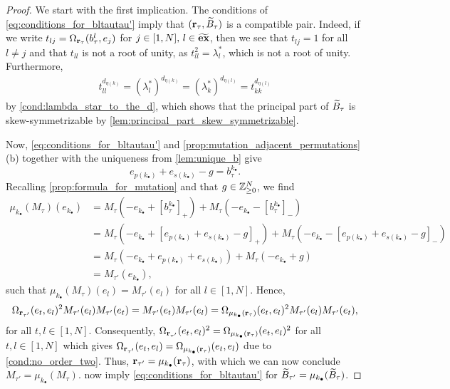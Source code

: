 \begin{proof}

	We start with the first implication. The conditions of
	\cref{eq:conditions_for_bltautau'} imply that $(\mathbf{r}_\tau, \widetilde{B}_{\tau})$ is a compatible
	pair. Indeed, if we write $t_{lj} = \Omega_{\mathbf{r}_\tau}(b^l_{\tau}, e_j)$ for $j\in[1,
			N],\, l \in \widetilde{\mathbf{ex}}$, then we see that $t_{lj} = 1$ for all $l \neq j$ and that
	$t_{ll}$ is not a root of unity, as $t_{ll}^2 = \lambda_l^*$, which is not a root of
	unity. Furthermore,
	\begin{align*}
		t_{ll}^{d_{\eta(k)}}  = (\lambda^*_l)^{d_{\eta(k)}} = (\lambda^*_k)^{d_{\eta(l)}} = t_{kk}^{d_{\eta(l)}}
	\end{align*}
	by \cref{cond:lambda_star_to_the_d}, which shows that the principal part of
	$\widetilde{B}_{\tau}$ is skew-symmetrizable by \cref{lem:principal_part_skew_symmetrizable}.

	Now, \cref{eq:conditions_for_bltautau'} and \cref{prop:mutation_adjacent_permutations}
	(b) together with the uniqueness from \cref{lem:unique_b} give
	\begin{equation*}
		e_{p(k_\bullet)} + e_{s(k_\bullet)} - g = b^{k_\bullet}_{\tau}.
	\end{equation*}
	Recalling \cref{prop:formula_for_mutation} and that $g \in \mathbb{Z}_{\geq 0}^N$, we find
	\begin{align*}
		\mu_{k_\bullet}(M_\tau)(e_{k_\bullet})
		 & = M_\tau(-e_{k_\bullet} + [b^{k_\bullet}_{\tau}]_{+}) + M_\tau(-e_{k_\bullet} - [b^{k_\bullet}_{\tau}]_{-})                                       \\
		 & = M_\tau(-e_{k_\bullet} + [e_{p(k_\bullet)} + e_{s(k_\bullet)} - g]_{+}) + M_\tau(-e_{k_\bullet} - [e_{p(k_\bullet)} + e_{s(k_\bullet)} - g]_{-}) \\
		 & = M_\tau(-e_{k_\bullet} + e_{p(k_\bullet)} + e_{s(k_\bullet)}) + M_\tau(-e_{k_\bullet} + g)                                                       \\
		 & = M_{\tau'}(e_{k_\bullet}),
	\end{align*}
	such that $\mu_{k_\bullet}(M_\tau)(e_l) = M_{\tau'}(e_l)$ for all $l \in [1, N]$. Hence,
	\begin{equation*}
		\Omega_{\mathbf{r}_{\tau'}}(e_t, e_l)^2 M_{\tau'}(e_l)M_{\tau'}(e_t) = M_{\tau'}(e_t)M_{\tau'}(e_l) = \Omega_{\mu_{k_\bullet}(\mathbf{r}_{\tau})}(e_t, e_l)^2 M_{\tau'}(e_l)M_{\tau'}(e_t),
	\end{equation*}
	for all $t, l \in [1, N]$. Consequently, $\Omega_{\mathbf{r}_{\tau'}}(e_t, e_l)^2 =
		\Omega_{\mu_{k_\bullet}(\mathbf{r}_\tau)}(e_t, e_l)^2$ for all $t, l \in [1, N]$ which gives
	$\Omega_{\mathbf{r}_{\tau'}}(e_t, e_l) = \Omega_{\mu_{k_\bullet}(\mathbf{r}_\tau)}(e_t, e_l)$ due
	to \cref{cond:no_order_two}. Thus, $\mathbf{r}_{\tau'} = \mu_{k_\bullet}(\mathbf{r}_{\tau})$, with
	which we can now conclude $M_{\tau'} = \mu_{k_\bullet}(M_\tau)$.
	 now imply
	\cref{eq:conditions_for_bltautau'} for $\widetilde{B}_{\tau'} = \mu_{k_\bullet}(\widetilde{B}_{\tau})$.


\end{proof}
